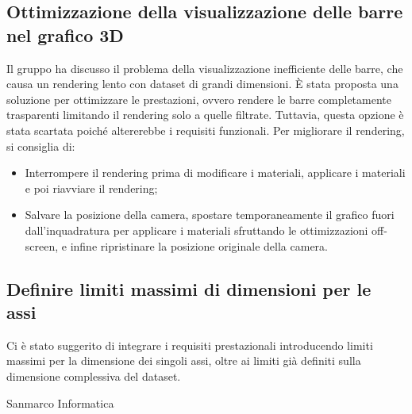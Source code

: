 \subsection{Ottimizzazione della visualizzazione delle barre nel grafico 3D}
Il gruppo ha discusso il problema della visualizzazione inefficiente delle barre, che causa un rendering lento con dataset di grandi dimensioni. È stata proposta una soluzione per ottimizzare le prestazioni, ovvero rendere le barre completamente trasparenti limitando il rendering solo a quelle filtrate. Tuttavia, questa opzione è stata scartata poiché altererebbe i requisiti funzionali.
Per migliorare il rendering, si consiglia di:
\begin{itemize}
\item Interrompere il rendering prima di modificare i materiali, applicare i materiali e poi riavviare il rendering;
\item Salvare la posizione della camera, spostare temporaneamente il grafico fuori dall'inquadratura per applicare i materiali sfruttando le ottimizzazioni off-screen, e infine ripristinare la posizione originale della camera.
\end{itemize}
\subsection{Definire limiti massimi di dimensioni per le assi}
Ci è stato suggerito di integrare i requisiti prestazionali introducendo limiti massimi per la dimensione dei singoli assi, oltre ai limiti già definiti sulla dimensione complessiva del dataset.

\hfill\signature{Approvazione esterna}{Sanmarco Informatica}
